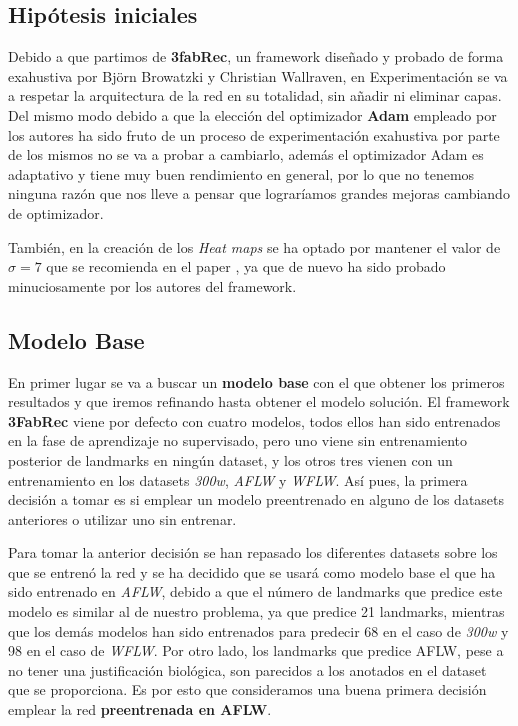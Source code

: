     \subsection{Hipótesis iniciales}
        \noindent Debido a que partimos de \textbf{3fabRec}, un framework diseñado y probado de forma exahustiva por Björn Browatzki y Christian Wallraven, en Experimentación se va a respetar la arquitectura de la red en su totalidad, sin añadir ni eliminar capas. Del mismo modo debido a que la elección del optimizador \textbf{Adam} empleado por los autores ha sido fruto de un proceso de experimentación exahustiva por parte de los mismos no se va a probar a cambiarlo, además el optimizador Adam es adaptativo y tiene muy buen rendimiento en general, por lo que no tenemos ninguna razón que nos lleve a pensar que lograríamos grandes mejoras cambiando de optimizador.

        \medskip

        \noindent También, en la creación de los \textit{Heat maps} se ha optado por mantener el valor de $\sigma =7$ que se recomienda en el paper \cite{browatzki20203fabrec}, ya que de nuevo ha sido probado minuciosamente por los autores del framework.
    
    \subsection{Modelo Base}
        \noindent En primer lugar se va a buscar un \textbf{modelo base} con el que obtener los primeros resultados y que iremos refinando hasta obtener el modelo solución. El framework \textbf{3FabRec} viene por defecto con cuatro modelos, todos ellos han sido entrenados en la fase de aprendizaje no supervisado, pero uno viene sin entrenamiento posterior de landmarks en ningún dataset, y los otros tres vienen con un entrenamiento en los datasets \textit{300w}, \textit{AFLW} y \textit{WFLW}. Así pues, la primera decisión a tomar es si emplear un modelo preentrenado en alguno de los datasets anteriores o utilizar uno sin entrenar. 

        \medskip

        \noindent Para tomar la anterior decisión se han repasado los diferentes datasets sobre los que se entrenó la red y se ha decidido que se usará como modelo base el que ha sido entrenado en \textit{AFLW}, debido a que el número de landmarks que predice este modelo es similar al de nuestro problema, ya que predice 21 landmarks, mientras que los demás modelos han sido entrenados para predecir 68 en el caso de \textit{300w} y 98 en el caso de \textit{WFLW}. Por otro lado, los landmarks que predice AFLW, pese a no tener una justificación biológica, son parecidos a los anotados en el dataset que se proporciona. Es por esto que consideramos una buena primera decisión emplear la red \textbf{preentrenada en AFLW}.


